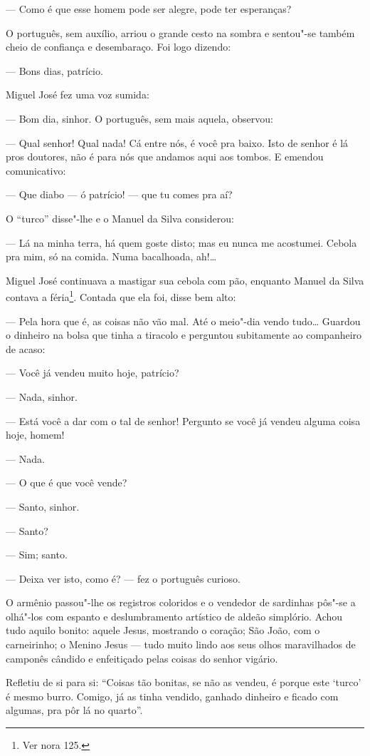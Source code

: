 --- Como é que esse homem pode ser alegre, pode ter esperanças?

O português, sem auxílio, arriou o grande cesto na sombra e sentou"-se
também cheio de confiança e desembaraço. Foi logo dizendo:

--- Bons dias, patrício.

Miguel José fez uma voz sumida:

--- Bom dia, sinhor. O português, sem mais aquela, observou:

--- Qual senhor! Qual nada! Cá entre nós, é você pra baixo. Isto de
senhor é lá pros doutores, não é para nós que andamos aqui aos tombos. E
emendou comunicativo:

--- Que diabo --- ó patrício! --- que tu comes pra aí?

O ``turco'' disse"-lhe e o Manuel da Silva considerou:

--- Lá na minha terra, há quem goste disto; mas eu nunca me acostumei.
Cebola pra mim, só na comida. Numa bacalhoada, ah!\ldots{}

Miguel José continuava a mastigar sua cebola com pão, enquanto Manuel da
Silva contava a féria\footnote{Ver nora 125.}. Contada que ela foi,
disse bem alto:

--- Pela hora que é, as coisas não vão mal. Até o meio"-dia vendo tudo\ldots{}
Guardou o dinheiro na bolsa que tinha a tiracolo e perguntou subitamente
ao companheiro de acaso:

--- Você já vendeu muito hoje, patrício?

--- Nada, sinhor.

--- Está você a dar com o tal de senhor! Pergunto se você já vendeu
alguma coisa hoje, homem!

--- Nada.

--- O que é que você vende?

--- Santo, sinhor.

--- Santo?

--- Sim; santo.

--- Deixa ver isto, como é? --- fez o português curioso.

O armênio passou"-lhe os registros coloridos e o vendedor de sardinhas
pôs"-se a olhá"-los com espanto e deslumbramento artístico de aldeão
simplório. Achou tudo aquilo bonito: aquele Jesus, mostrando o coração;
São João, com o carneirinho; o Menino Jesus --- tudo muito lindo aos
seus olhos maravilhados de camponês cândido e enfeitiçado pelas coisas
do senhor vigário.

Refletiu de si para si: ``Coisas tão bonitas, se não as vendeu, é porque
este `turco' é mesmo burro. Comigo, já as tinha vendido, ganhado
dinheiro e ficado com algumas, pra pôr lá no quarto''.

